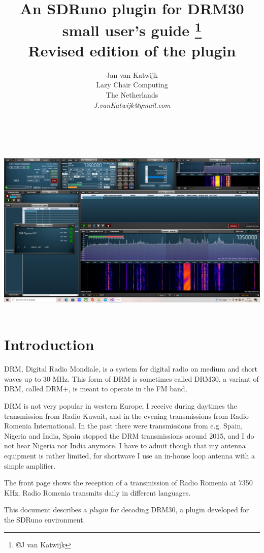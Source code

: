 \documentclass[10pt]{article}
\begin{document}
\title{An SDRuno plugin for DRM30\\
{small user's guide {\footnote {\copyright J van Katwijk}}\\
Revised edition of the plugin}}
\author{
Jan van Katwijk\\
Lazy Chair Computing \\
The Netherlands\\
{\em J.vanKatwijk@gmail.com}}
\maketitle
\ \\
\ \\
\includegraphics[width=160mm]{drm-decoder.png}
\ \\
\section{Introduction}
DRM, Digital Radio Mondiale, is a system for digital radio on medium and
short waves up to 30 MHz. This form of DRM is sometimes called DRM30, a variant
of DRM, called DRM+, is meant to operate in the FM band,
\par 
DRM is not very popular in western Europe, I receive during daytimes the
transmission from Radio Kuwait, and in the evening transmissions from
Radio Romenia International.
In the past there were transmissions from e.g. Spain, Nigeria and India,
Spain stopped the DRM transmissions around 2015, and
I do not hear Nigeria nor India anymore.
I have to admit though that my antenna equipment is rather limited,
for shortwave I use an in-house loop antenna with a simple amplifier.
\par
The front page shows the reception of a transmission of Radio Romenia at 7350 KHz, Radio Romenia transmits daily in different languages.
\par
This document describes a {\em plugin} for decoding DRM30,
a plugin developed for the SDRuno environment.
\end{document}

